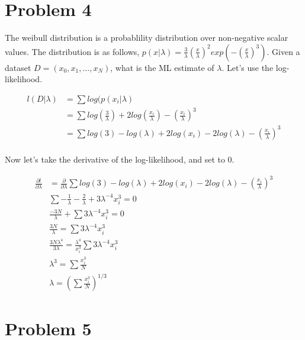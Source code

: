 \documentclass[paper=a4, fontsize=11pt]{scrartcl} %
\begin{document}
\section{Problem 4}
The weibull distribution is a probablility distribution over non-negative scalar values.  
The distribution is as follows,  $p(x|\lambda) = \frac{3}{\lambda}(\frac{x}{\lambda})^2exp(-(\frac{x}{\lambda})^3)$.
Given a dataset $D = (x_0,x_1,...,x_N)$, what is the ML estimate of $\lambda$.
Let's use the log-likelihood.

\begin{align}
l(D|\lambda) &= \sum log(p(x_i|\lambda) \\
&= \sum log(\frac{3}{\lambda})+2log(\frac{x_i}{\lambda})-(\frac{x_i}{\lambda})^3 \\
&= \sum log(3) - log(\lambda) +2log(x_i) - 2log(\lambda) -(\frac{x_i}{\lambda})^3 \\
\end{align}

Now let's take the derivative of the log-likelihood, and set to 0.

\begin{align}
\frac{\partial l}{\partial \lambda} &=\frac{\partial}{\partial \lambda} \sum log(3) - log(\lambda) +2log(x_i) - 2log(\lambda) -(\frac{x_i}{\lambda})^3 \\
&\sum -\frac{1}{\lambda} - \frac{2}{\lambda}  + 3\lambda^{-4}x_i^{3} = 0 \\
&\frac{-3N}{\lambda} + \sum 3\lambda^{-4}x_i^{3} = 0 \\
& \frac{3N}{\lambda} =  \sum 3\lambda^{-4}x_i^{3} \\ 
& \frac{3N\lambda^4}{3\lambda} = \frac{\lambda^4}{x_i^3} \sum 3\lambda^{-4}x_i^{3} \\
& \lambda^3 = \sum \frac{x_i^{3}}{N} \\
& \lambda = (\sum \frac{x_i^{3}}{N})^{1/3}
\end{align}

\section{Problem 5}
\end{document}
